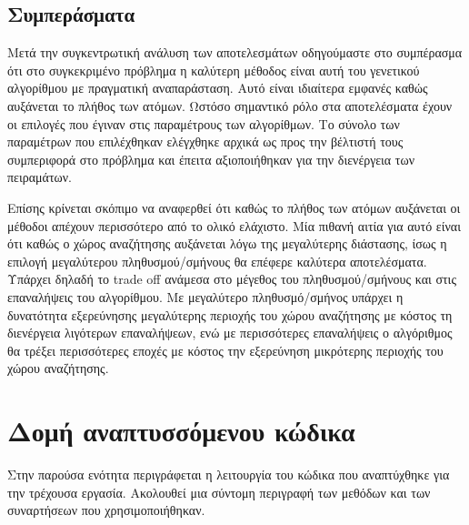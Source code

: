 \documentclass[12pt, a4paper]{article}
\newcommand{\en}{\selectlanguage{english}}
\newcommand{\gr}{\selectlanguage{greek}}
\begin{document}
\subsection{Συμπεράσματα}
Μετά την συγκεντρωτική ανάλυση των αποτελεσμάτων οδηγούμαστε στο συμπέρασμα ότι στο συγκεκριμένο πρόβλημα η καλύτερη μέθοδος είναι αυτή του γενετικού αλγορίθμου με πραγματική αναπαράσταση. Αυτό είναι ιδιαίτερα εμφανές καθώς αυξάνεται το πλήθος των ατόμων. Ωστόσο σημαντικό ρόλο στα αποτελέσματα έχουν οι επιλογές που έγιναν στις παραμέτρους των αλγορίθμων. Το σύνολο των παραμέτρων που επιλέχθηκαν ελέγχθηκε αρχικά ως προς την βέλτιστή τους συμπεριφορά στο πρόβλημα και έπειτα αξιοποιήθηκαν για την διενέργεια των πειραμάτων.

Επίσης κρίνεται σκόπιμο να αναφερθεί ότι καθώς το πλήθος των ατόμων αυξάνεται οι μέθοδοι απέχουν περισσότερο από το ολικό ελάχιστο. Μία πιθανή αιτία για αυτό είναι ότι καθώς ο χώρος αναζήτησης αυξάνεται λόγω της μεγαλύτερης διάστασης, ίσως η επιλογή μεγαλύτερου πληθυσμού/σμήνους θα επέφερε καλύτερα αποτελέσματα. Υπάρχει δηλαδή το \en trade off \gr ανάμεσα στο μέγεθος του πληθυσμού/σμήνους και στις επαναλήψεις του αλγορίθμου. Με μεγαλύτερο πληθυσμό/σμήνος υπάρχει η δυνατότητα εξερεύνησης μεγαλύτερης περιοχής του χώρου αναζήτησης με κόστος τη διενέργεια λιγότερων επαναλήψεων, ενώ με περισσότερες επαναλήψεις ο αλγόριθμος θα τρέξει περισσότερες εποχές με κόστος την εξερεύνηση μικρότερης περιοχής του χώρου αναζήτησης.

\section{Δομή αναπτυσσόμενου κώδικα}
\label{sec:Code}
Στην παρούσα ενότητα περιγράφεται η λειτουργία του κώδικα που αναπτύχθηκε για την τρέχουσα εργασία. Ακολουθεί μια σύντομη περιγραφή των μεθόδων και των συναρτήσεων που χρησιμοποιήθηκαν.\\
\end{document}
